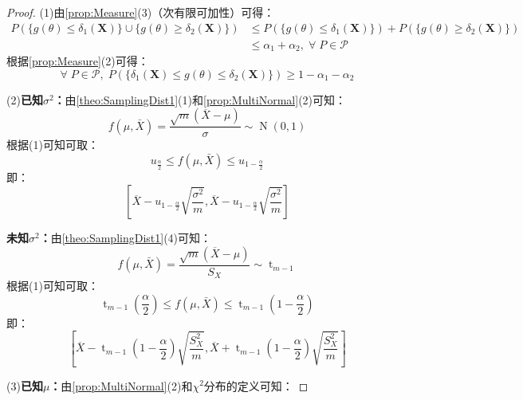 \begin{proof}
	(1)由\cref{prop:Measure}(3)（次有限可加性）可得：
	\begin{align*}
		P(\{g(\theta)\leqslant\delta_1(\mathbf{X})\}\cup\{g(\theta)\geqslant\delta_2(\mathbf{X})\})&\leqslant P(\{g(\theta)\leqslant\delta_1(\mathbf{X})\})+P(\{g(\theta)\geqslant\delta_2(\mathbf{X})\}) \\
		&\leqslant\alpha_1+\alpha_2,\;\forall\;P\in\mathscr{P}
	\end{align*}
	根据\cref{prop:Measure}(2)可得：
	\begin{equation*}
		\forall\;P\in\mathscr{P},\;P\left(\{\delta_1(\mathbf{X})\leqslant g(\theta)\leqslant\delta_2(\mathbf{X})\}\right)\geqslant1-\alpha_1-\alpha_2
	\end{equation*}\par
	(2)\textbf{已知$\sigma^2$：}由\cref{theo:SamplingDist1}(1)和\cref{prop:MultiNormal}(2)可知：
	\begin{equation*}
		f(\mu,\bar{X})=\frac{\sqrt{m}(\overline{X}-\mu)}{\sigma}\sim\operatorname{N}(0,1)
	\end{equation*}
	根据(1)可知可取：
	\begin{equation*}
		u_{\frac{\alpha}{2}}\leqslant f(\mu,\bar{X})\leqslant u_{1-\frac{\alpha}{2}}
	\end{equation*}
	即：
	\begin{equation*}
		\left[\overline{X}-u_{1-\frac{\alpha}{2}}\sqrt{\dfrac{\sigma^2}{m}},\overline{X}-u_{1-\frac{\alpha}{2}}\sqrt{\dfrac{\sigma^2}{m}}\right]
	\end{equation*}\par
	\textbf{未知$\sigma^2$：}由\cref{theo:SamplingDist1}(4)可知：
	\begin{equation*}
		f(\mu,\bar{X})=\frac{\sqrt{m}(\overline{X}-\mu)}{S_X}\sim\operatorname{t}_{m-1}
	\end{equation*}
	根据(1)可知可取：
	\begin{equation*}
		\operatorname{t}_{m-1}\left(\frac{\alpha}{2}\right)\leqslant f(\mu,\bar{X})\leqslant\operatorname{t}_{m-1}\left(1-\frac{\alpha}{2}\right)
	\end{equation*}
	即：
	\begin{equation*}
		\left[\overline{X}-\operatorname{t}_{m-1}\left(1-\frac{\alpha}{2}\right)\sqrt{\dfrac{S_X^2}{m}},\overline{X}+\operatorname{t}_{m-1}\left(1-\frac{\alpha}{2}\right)\sqrt{\dfrac{S_X^2}{m}}\right]
	\end{equation*}\par
	(3)\textbf{已知$\mu$：}由\cref{prop:MultiNormal}(2)和$\chi^2$分布的定义可知：

\end{proof}
